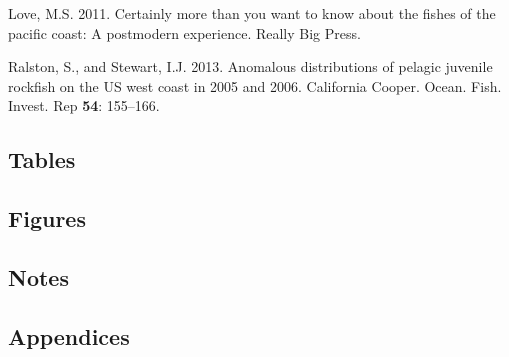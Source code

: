 \documentclass[
]{scrartcl}
\newlength{\cslhangindent}
\newlength{\cslentryspacingunit} %
\newenvironment{CSLReferences}[2] %
 {%
  \setlength{\parindent}{0pt}
  \ifodd #1
  \let\oldpar\par
  \def\par{\hangindent=\cslhangindent\oldpar}
  \fi
  \setlength{\parskip}{#2\cslentryspacingunit}
 }%
 {}
\begin{document}
\begin{CSLReferences}{1}{0}
\leavevmode{}%
Love, M.S. 2011. Certainly more than you want to know about the fishes
of the pacific coast: A postmodern experience. Really Big Press.

\leavevmode{}%
Ralston, S., and Stewart, I.J. 2013. Anomalous distributions of pelagic
juvenile rockfish on the US west coast in 2005 and 2006. California
Cooper. Ocean. Fish. Invest. Rep \textbf{54}: 155--166.

\end{CSLReferences}

\newpage{}

\hypertarget{tables}{%
\subsection{Tables}\label{tables}}

\newpage{}

\hypertarget{figures}{%
\subsection{Figures}\label{figures}}

\newpage{}

\hypertarget{notes}{%
\subsection{Notes}\label{notes}}

\newpage{}

\hypertarget{sec-appendix}{%
\subsection{Appendices}\label{sec-appendix}}
\end{document}
